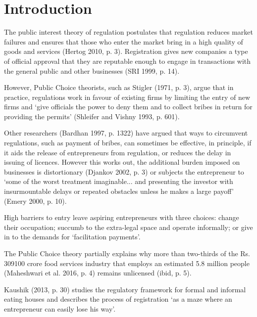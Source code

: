 \documentclass[a4paper, 12pt]{article}
\begin{document}
                    \newpage
                    \section{Introduction}
                    \label{intro}
                    
                    The public interest theory of regulation postulates that regulation reduces market failures and ensures that those who enter the market bring in a high quality of goods and services (Hertog 2010, p. 3). Registration gives new companies a type of official approval that they are reputable enough to engage in transactions with the general public and other businesses (SRI 1999, p. 14). 
                    
                    However, Public Choice theorists, such as Stigler (1971, p. 3), argue that in practice, regulations work in favour of existing firms by limiting the entry of new firms and ‘give officials the power to deny them and to collect bribes in return for providing the permits’ (Shleifer and Vishny 1993, p. 601). 
                    
                    Other researchers (Bardhan 1997, p. 1322) have argued that ways to circumvent regulations, such as payment of bribes, can sometimes be effective, in principle, if it aids the release of entrepreneurs from regulation, or reduces the delay in issuing of licences. However this works out, the additional burden imposed on businesses is distortionary (Djankov 2002, p. 3) or subjects the entrepreneur to ‘some of the worst treatment imaginable... and presenting the investor with insurmountable delays or repeated obstacles unless he makes a large payoff’ (Emery 2000, p. 10). 
                    
                    High barriers to entry leave aspiring entrepreneurs with three choices: change their occupation; succumb to the extra-legal space and operate informally; or give in to the demands for ‘facilitation payments’.
                    
                    The Public Choice theory partially explains why more than two-thirds of the Rs. 309100 crore food services industry that employs an estimated 5.8 million people (Maheshwari et al. 2016, p. 4) remains unlicensed (ibid, p. 5).
                    
                    Kaushik (2013, p. 30) studies the regulatory framework for formal and informal eating houses and describes the process of registration ‘as a maze where an entrepreneur can easily lose his way’. 
                    
\end{document}
